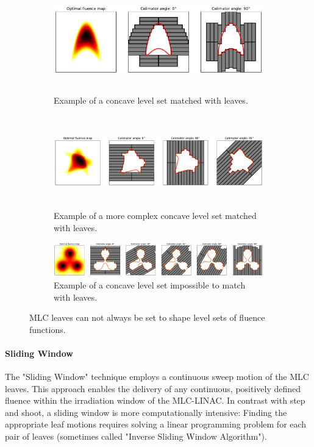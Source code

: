 \begin{figure}
	\centering
	\begin{subfigure}[b]{\textwidth}
		\centering
		\includegraphics[height=4.5cm]{_leaves_angle.pdf}
		\caption{Example of a concave level set matched with leaves.}
		\label{fig:leaves_angle}
	\end{subfigure}
	\hfill
	\begin{subfigure}[b]{\textwidth}
		\centering
		\includegraphics[height=4cm]{_leaves_angle_bis.pdf}
		\caption{Example of a more complex concave level set matched with leaves.}
		\label{fig:leaves_angle_bis}
	\end{subfigure}
	\hfill
	\begin{subfigure}[b]{\textwidth}
		\centering
		\includegraphics[width=\textwidth]{_leaves_angle_ter.pdf}
		\caption{Example of a concave level set impossible to match with leaves.}
		\label{fig:leaves_angle_ter}
	\end{subfigure}
	\caption{MLC leaves can not always be set to shape level sets of fluence functions.}
	\label{fig:leaves_angles}
\end{figure}

\paragraph[SW]{Sliding Window}
The "Sliding Window" technique employs a continuous sweep motion of the MLC leaves.
This approach enables the delivery of any continuous, positively defined fluence within the irradiation window of the MLC-LINAC.
In contrast with step and shoot, a sliding window is more computationally intensive:
Finding the appropriate leaf motions requires solving a linear programming problem for each pair of leaves (sometimes called "Inverse Sliding Window Algorithm").

